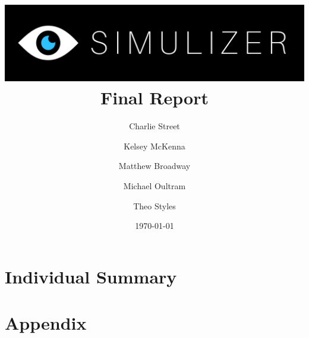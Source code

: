 \documentclass[12pt, a4paper]{article}
\title{
  \includegraphics[width=\textwidth]{segments/SimulizerLogo.png}
  \huge\textbf{Final Report}
}
\author{
  Charlie Street
  \and
  Kelsey McKenna
  \and
  Matthew Broadway
  \and
  Michael Oultram
  \and
  Theo Styles
}
\date{\today}
\begin{document}
\maketitle

\begin{abstract}
\noindent\lipsum[1]
\end{abstract}

\clearpage
\tableofcontents
\clearpage










\newpage

\section{Individual Summary}

\newpage

\newpage

\newpage

\newpage

\newpage

\section{Appendix}



\end{document}
